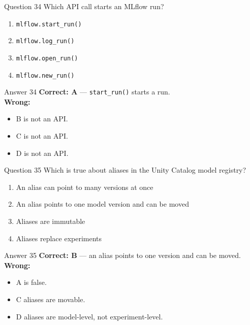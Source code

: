 \documentclass[aspectratio=169,11pt]{beamer}
\begin{document}
	\begin{frame}{Question 34}
		Which API call starts an MLflow run?
		\begin{enumerate}[label=\Alph*.]
			\item \texttt{mlflow.start\_run()}
			\item \texttt{mlflow.log\_run()}
			\item \texttt{mlflow.open\_run()}
			\item \texttt{mlflow.new\_run()}
		\end{enumerate}
	\end{frame}
	\begin{frame}{Answer 34}
		\textbf{Correct: A} --- \texttt{start\_run()} starts a run.\\
		\vspace{0.5em}
		\textbf{Wrong:}
		\begin{itemize}
			\item B is not an API.
			\item C is not an API.
			\item D is not an API.
		\end{itemize}
	\end{frame}
	
	\begin{frame}{Question 35}
		Which is true about aliases in the Unity Catalog model registry?
		\begin{enumerate}[label=\Alph*.]
			\item An alias can point to many versions at once
			\item An alias points to one model version and can be moved
			\item Aliases are immutable
			\item Aliases replace experiments
		\end{enumerate}
	\end{frame}
	\begin{frame}{Answer 35}
		\textbf{Correct: B} --- an alias points to one version and can be moved.\\
		\vspace{0.5em}
		\textbf{Wrong:}
		\begin{itemize}
			\item A is false.
			\item C aliases are movable.
			\item D aliases are model-level, not experiment-level.
		\end{itemize}
	\end{frame}
	
\end{document}
